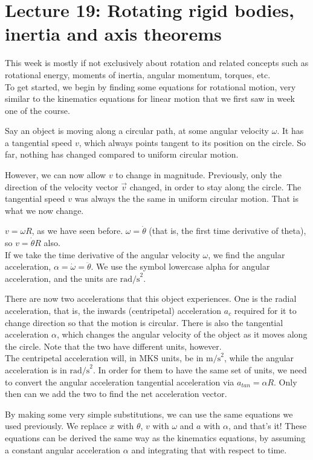 
\section{Lecture 19: Rotating rigid bodies, inertia and axis theorems}

This week is mostly if not exclusively about rotation and related concepts such as rotational energy, moments of inertia, angular momentum, torques, etc.\\
To get started, we begin by finding some equations for rotational motion, very similar to the kinematics equations for linear motion that we first saw in week one of the course.

Say an object is moving along a circular path, at some angular velocity $\omega$. It has a tangential speed $v$, which always points tangent to its position on the circle. So far, nothing has changed compared to uniform circular motion.

However, we can now allow $v$ to change in magnitude. Previously, only the direction of the velocity vector $\vec{v}$ changed, in order to stay along the circle. The tangential speed $v$ was always the the same in uniform circular motion. That is what we now change.

$v = \omega R$, as we have seen before. $\omega = \dot{\theta}$ (that is, the first time derivative of theta), so $v = \dot{\theta} R$ also.\\
If we take the time derivative of the angular velocity $\omega$, we find the angular acceleration, $\alpha = \dot{\omega} = \ddot{\theta}$. We use the symbol lowercase alpha for angular acceleration, and the units are $\text{rad/s}^2$.

There are now two accelerations that this object experiences. One is the radial acceleration, that is, the inwards (centripetal) acceleration $a_c$ required for it to change direction so that the motion is circular. There is also the tangential acceleration $\alpha$, which changes the angular velocity of the object as it moves along the circle.
Note that the two have different units, however.\\
The centripetal acceleration will, in MKS units, be in $\text{m/s}^2$, while the angular acceleration is in $\text{rad/s}^2$. In order for them to have the same set of units, we need to convert the angular acceleration tangential acceleration via $a_{tan} = \alpha R$. Only then can we add the two to find the net acceleration vector.

By making some very simple substitutions, we can use the same equations we used previously. We replace $x$ with $\theta$, $v$ with $\omega$ and $a$ with $\alpha$, and that's it! These equations can be derived the same way as the kinematics equations, by assuming a constant angular acceleration $\alpha$ and integrating that with respect to time.

